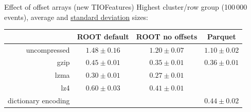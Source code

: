 \documentclass[aspectratio=169]{beamer}
\begin{document}
\begin{frame}{Effect of offset arrays (new TIOFeatures)}
\vspace{0.25 cm}
Highest cluster/row group (100\,000 events), average and \underline{standard deviation} sizes:

\renewcommand{\arraystretch}{1.2}

\begin{center}
\begin{tabular}{r c c c}
                    & ROOT default    & ROOT no offsets & Parquet         \\\hline
uncompressed        & $1.48 \pm 0.16$ & $1.20 \pm 0.07$ & $1.10 \pm 0.02$ \\
gzip                & $0.45 \pm 0.01$ & $0.35 \pm 0.01$ & $0.36 \pm 0.01$ \\
lzma                & $0.30 \pm 0.01$ & $0.27 \pm 0.01$ &                 \\
lz4                 & $0.60 \pm 0.03$ & $0.41 \pm 0.01$ &                 \\
dictionary encoding &                 &                 & $0.44 \pm 0.02$ \\
\end{tabular}
\end{center}

\end{frame}
\end{document}
